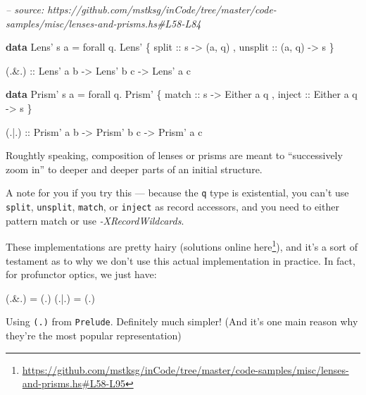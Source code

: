 \documentclass[]{article}
\newenvironment{Shaded}{}{}
\newcommand{\CommentTok}[1]{\textcolor[rgb]{0.38,0.63,0.69}{\textit{#1}}}
\newcommand{\DataTypeTok}[1]{\textcolor[rgb]{0.56,0.13,0.00}{#1}}
\newcommand{\FunctionTok}[1]{\textcolor[rgb]{0.02,0.16,0.49}{#1}}
\newcommand{\KeywordTok}[1]{\textcolor[rgb]{0.00,0.44,0.13}{\textbf{#1}}}
\newcommand{\NormalTok}[1]{#1}
\newcommand{\OtherTok}[1]{\textcolor[rgb]{0.00,0.44,0.13}{#1}}
\renewcommand{\href}[2]{#2\footnote{\url{#1}}}
\begin{document}
\begin{itemize}
\begin{Shaded}
\begin{Highlighting}[]
\CommentTok{-- source: https://github.com/mstksg/inCode/tree/master/code-samples/misc/lenses-and-prisms.hs#L58-L84}

\KeywordTok{data} \DataTypeTok{Lens'}\NormalTok{ s a }\FunctionTok{=}\NormalTok{ forall q}\FunctionTok{.} \DataTypeTok{Lens'}
\NormalTok{    \{}\OtherTok{ split   ::}\NormalTok{ s }\OtherTok{->}\NormalTok{ (a, q)}
\NormalTok{    ,}\OtherTok{ unsplit ::}\NormalTok{ (a, q) }\OtherTok{->}\NormalTok{ s}
\NormalTok{    \}}

\OtherTok{(.&.) ::} \DataTypeTok{Lens'}\NormalTok{ a b}
      \OtherTok{->} \DataTypeTok{Lens'}\NormalTok{ b c}
      \OtherTok{->} \DataTypeTok{Lens'}\NormalTok{ a c}

\KeywordTok{data} \DataTypeTok{Prism'}\NormalTok{ s a }\FunctionTok{=}\NormalTok{ forall q}\FunctionTok{.} \DataTypeTok{Prism'}
\NormalTok{    \{}\OtherTok{ match  ::}\NormalTok{ s }\OtherTok{->} \DataTypeTok{Either}\NormalTok{ a q}
\NormalTok{    ,}\OtherTok{ inject ::} \DataTypeTok{Either}\NormalTok{ a q }\OtherTok{->}\NormalTok{ s}
\NormalTok{    \}}

\OtherTok{(.|.) ::} \DataTypeTok{Prism'}\NormalTok{ a b}
      \OtherTok{->} \DataTypeTok{Prism'}\NormalTok{ b c}
      \OtherTok{->} \DataTypeTok{Prism'}\NormalTok{ a c}
\end{Highlighting}
\end{Shaded}

  Roughtly speaking, composition of lenses or prisms are meant to ``successively
  zoom in'' to deeper and deeper parts of an initial structure.

  A note for you if you try this --- because the \texttt{q} type is existential,
  you can't use \texttt{split}, \texttt{unsplit}, \texttt{match}, or
  \texttt{inject} as record accessors, and you need to either pattern match or
  use \emph{-XRecordWildcards}.

  These implementations are pretty hairy (solutions
  \href{https://github.com/mstksg/inCode/tree/master/code-samples/misc/lenses-and-prisms.hs\#L58-L95}{online
  here}), and it's a sort of testament as to why we don't use this actual
  implementation in practice. In fact, for profunctor optics, we just have:

\begin{Shaded}
\begin{Highlighting}[]
\NormalTok{(}\FunctionTok{.&.}\NormalTok{) }\FunctionTok{=}\NormalTok{ (}\FunctionTok{.}\NormalTok{)}
\NormalTok{(}\FunctionTok{.|.}\NormalTok{) }\FunctionTok{=}\NormalTok{ (}\FunctionTok{.}\NormalTok{)}
\end{Highlighting}
\end{Shaded}

  Using \texttt{(.)} from \texttt{Prelude}. Definitely much simpler! (And it's
  one main reason why they're the most popular representation)
\end{itemize}
\end{document}
